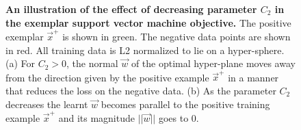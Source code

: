       \begin{figure}[t]
         \begin{center}
            \caption{
               {\bf An illustration of the effect of decreasing parameter $C_2$ in the exemplar support vector machine objective.} 
               The positive exemplar $\vec{x}^+$ is shown in green. The negative data points are shown in red. All training data is L2 normalized to lie on a hyper-sphere. (a) For $C_2>0$, the normal $\vec{w}$ of the optimal hyper-plane moves away from the direction given by the positive example $\vec{x}^+$ in a manner that reduces the loss on the negative data.  (b) As the parameter $C_2$ decreases the learnt $\vec{w}$ becomes parallel to the positive training example $\vec{x}^+$ and its magnitude $||\vec{w}||$ goes to 0.
            }
            \label{fig:C2effect}
         \end{center}
      \end{figure}
